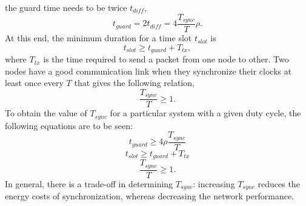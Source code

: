 \documentclass[journal]{IEEEtran}
\begin{document}
the guard time needs to be twice $t_{diff}$,
\begin{equation}
t_{guard}= 2t_{diff} = 4\frac{T_{sync}}{T}\rho.
\end{equation}
At this end, the minimum duration for a time slot $t_{slot}$ is
\begin{equation}
t_{slot} \geq t_{guard} + T_{tx},
\end{equation}
where $T_{tx}$ is the time required to send a packet from one node to other.
\newline Two nodes have a good communication link when they synchronize
their clocks at least once every $T$ that gives the following
relation,
\begin{equation}
\frac{T_{sync}}{T}\geq 1.
\end{equation}
To obtain the value of $T_{sync}$ for a particular system with a given duty cycle, the following equations are to be seen:
\begin{equation}
t_{guard} \geq 4\rho \frac{T_{sync}}{T}
\end{equation}
\begin{equation}
t_{slot} \geq t_{guard} + T_{tx}
\end{equation}
\begin{equation}
\frac{T_{sync}}{T} \geq 1.
\end{equation}
In general, there is a trade-off in determining $T_{sync}$: increasing $T_{sync}$ reduces the energy costs of synchronization, whereas decreasing the network performance.
\end{document}
